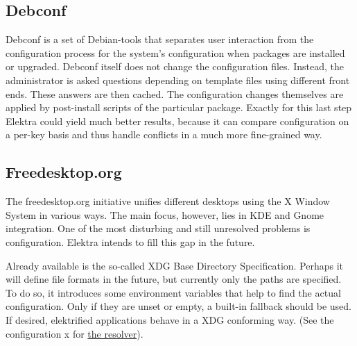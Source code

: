 \subsection*{Debconf}

Debconf is a set of Debian-\/tools that separates user interaction from the configuration process for the system's configuration when packages are installed or upgraded. Debconf itself does not change the configuration files. Instead, the administrator is asked questions depending on template files using different front ends. These answers are then cached. The configuration changes themselves are applied by post-\/install scripts of the particular package. Exactly for this last step Elektra could yield much better results, because it can compare configuration on a per-\/key basis and thus handle conflicts in a much more fine-\/grained way.

\subsection*{Freedesktop.\+org}

The freedesktop.org initiative unifies different desktops using the X Window System in various ways. The main focus, however, lies in K\+D\+E and Gnome integration. One of the most disturbing and still unresolved problems is configuration. Elektra intends to fill this gap in the future.

Already available is the so-\/called X\+D\+G Base Directory Specification. Perhaps it will define file formats in the future, but currently only the paths are specified. To do so, it introduces some environment variables that help to find the actual configuration. Only if they are unset or empty, a built-\/in fallback should be used. If desired, elektrified applications behave in a X\+D\+G conforming way. (See the configuration x for \hyperlink{md_src_plugins_resolver_README_src_plugins_resolver_README_md}{the resolver}). 